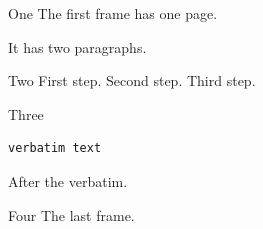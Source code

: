\documentclass{beamer}
\begin{document}

\begin{frame}{One}
  The first frame has one page.

  It has two paragraphs.
\end{frame}

\begin{frame}{Two}
  First step.
  \pause
  Second step.
  \pause
  Third step.
\end{frame}

\begin{frame}[fragile]{Three}
\begin{verbatim}
verbatim text
\end{verbatim}
  After the verbatim.
\end{frame}

\begin{frame}{Four}
  The last frame.
\end{frame}
\end{document}
